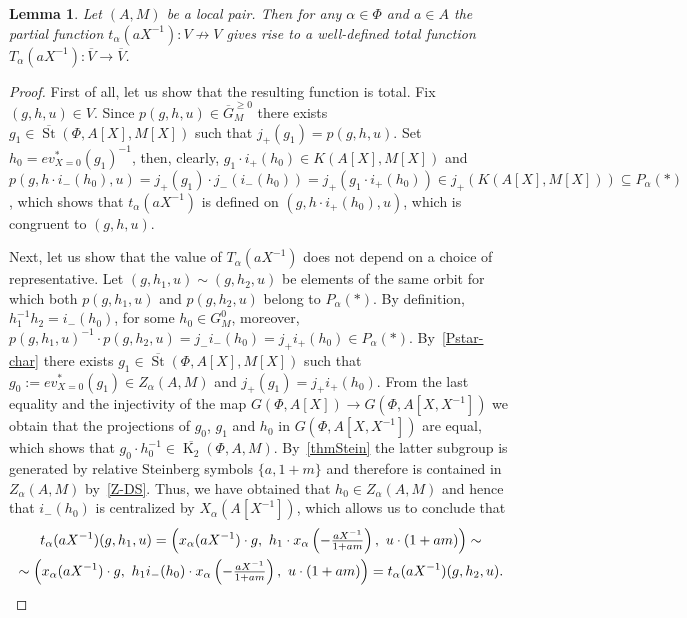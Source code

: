 \documentclass[oneside, 8pt]{amsart}
\newtheorem{lemma}{Lemma}
\theoremstyle{remark}
\theoremstyle{definition}
\DeclareMathOperator{\St}{St}
\DeclareMathOperator{\K}{K}
\numberwithin{equation}{section}
\begin{document}
\begin{lemma}\label{lem:orbit-action} Let $(A, M)$ be a local pair. 
Then for any $\alpha \in \Phi$ and $a \in A$ the partial function $t_\alpha(aX^{-1}) \colon V \not \to V$ gives rise to a well-defined total function $T_\alpha(aX^{-1}) \colon \overline{V} \to \overline{V}$. \end{lemma}
\begin{proof}
 First of all, let us show that the resulting function is total. 
 Fix $(g, h, u) \in V$. Since $p(g, h, u) \in \overline{G}^{\geq 0}_M$ there exists $g_1 \in \overline{\St}(\Phi, A[X], M[X])$ such that $j_+(g_1) = p(g, h, u).$
 Set $h_0 = ev^*_{X=0}(g_1)^{-1}$, then, clearly, $g_1 \cdot i_+(h_0) \in K(A[X], M[X])$ and 
 $p(g, h \cdot i_-(h_0), u) = j_+(g_1) \cdot j_-(i_-(h_0)) = j_+(g_1 \cdot i_+(h_0)) \in j_+(K(A[X], M[X])) \subseteq P_\alpha(*)$,
  which shows that $t_\alpha(aX^{-1})$ is defined on $(g, h \cdot i_+(h_0), u)$, which is congruent to $(g, h, u)$.
  
 Next, let us show that the value of $T_\alpha(aX^{-1})$ does not depend on a choice of representative.
 Let $(g, h_1, u) \sim (g, h_2, u)$ be elements of the same orbit for which both $p(g, h_1, u)$ and $p(g, h_2, u)$ belong to $P_\alpha(*)$.
 By definition, $h_1^{-1} h_2 = i_-(h_0)$, for some $h_0 \in G^0_M$, moreover, 
  $p(g, h_1, u)^{-1} \cdot p(g, h_2, u) = j_- i_-(h_0) = j_+ i_+(h_0) \in P_\alpha(*)$.
 By~\cref{Pstar-char} there exists $g_1 \in \overline{\St}(\Phi, A[X], M[X])$ such that $g_0 := ev^*_{X=0}(g_1) \in Z_\alpha(A, M)$ and $j_+(g_1) = j_+ i_+ (h_0)$.
 From the last equality and the injectivity of the map $G(\Phi, A[X]) \to G(\Phi, A[X, X^{-1}])$ we obtain that
 the projections of $g_0$, $g_1$ and $h_0$ in $G(\Phi, A[X, X^{-1}])$ are equal, which shows that $g_0 \cdot h_0^{-1} \in \overline{\K_2}(\Phi, A, M)$. 
 By~\cref{thmStein} the latter subgroup is generated by relative Steinberg symbols $\{ a, 1 + m \}$ and therefore is contained in $Z_\alpha(A, M)$ by~\cref{Z-DS}. Thus, we have obtained that $h_0 \in Z_\alpha(A, M)$ and hence that $i_-(h_0)$ is centralized by $X_\alpha(A[X^{-1}])$, which allows us to conclude that
 \begin{multline} \nonumber
  t_\alpha(aX^{-1})(g, h_1, u) = \left( x_\alpha(aX^{-1})\cdot g ,\ h_1 \cdot x_\alpha\left(-\tfrac{aX^{-1}}{1 + am}\right),\ u \cdot (1 + am)\right) \sim \\
  \sim \left( x_\alpha(aX^{-1})\cdot g ,\ h_1 i_-(h_0) \cdot x_\alpha\left(-\tfrac{aX^{-1}}{1 + am}\right),\ u \cdot (1 + am)\right) = t_\alpha(aX^{-1})(g, h_2, u). \qedhere
 \end{multline} \end{proof}
\end{document}
